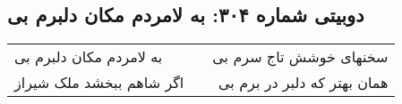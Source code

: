 \begin{center}
\section*{دوبیتی شماره ۳۰۴: به لامردم مکان دلبرم بی}
\label{sec:304}
\begin{longtable}{l p{0.5cm} r}
به لامردم مکان دلبرم بی
&&
سخنهای خوشش تاج سرم بی
\\
اگر شاهم ببخشد ملک شیراز
&&
همان بهتر که دلبر در برم بی
\\
\end{longtable}
\end{center}
